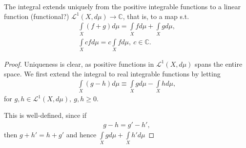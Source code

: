 \begin{prop}
    The integral extends uniquely from the positive integrable functions to a linear function (functional?) \(\mathcal{L}^{1}(X, d\mu) \rightarrow \mathbb{C}\),
    that is, to a map s.t.
    \begin{align*}
        \int\limits_{X}(f + g)d\mu = \int\limits_{X}fd\mu + \int\limits_{X}gd\mu, \\
        \int\limits_{X}cfd\mu = c \int\limits_{X}fd\mu, \ c\in\mathbb{C}.
    \end{align*}
\end{prop}
\begin{proof}
    Uniqueness is clear, as positive functions in \(\mathcal{L}^{1}(X, d\mu)\) spans the entire space. We first extend the integral to real
    integrable functions by letting
    \begin{align*}
        \int\limits_{X}(g-h)d\mu \equiv \int\limits_{X}gd\mu - \int\limits_{X}hd\mu, 
    \end{align*}
    for \(g,h\in \mathcal{L}^{1}(X,d\mu), \ g,h\geq0\).

    This is well-defined, since if
    \begin{align*}
        g - h = g' - h',
    \end{align*}
    then \(g+h' = h + g'\) and hence \(\int\limits_{X}gd\mu + \int\limits_{X}h'd\mu\)
\end{proof}